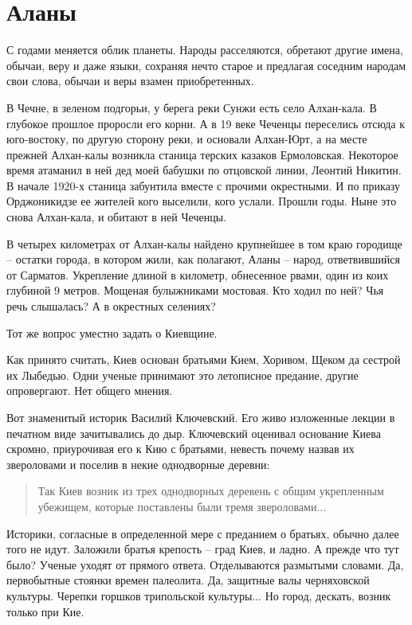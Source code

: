 \chapter{Аланы}

С годами меняется облик планеты. Народы расселяются, обретают другие имена, обычаи, веру и даже языки, сохраняя нечто старое и предлагая соседним народам свои слова, обычаи и веры взамен приобретенных.

В Чечне, в зеленом подгорьи, у берега реки Сунжи есть село Алхан-кала. В глубокое прошлое проросли его корни. А в 19 веке Чеченцы переселись отсюда к юго-востоку, по другую сторону реки, и основали Алхан-Юрт, а на месте прежней Алхан-калы возникла станица терских казаков Ермоловская. Некоторое время атаманил в ней дед моей бабушки по отцовской линии, Леонтий Никитин. В начале 1920-х станица забунтила вместе с прочими окрестными. И по приказу Орджоникидзе ее жителей кого выселили, кого услали. Прошли годы. Ныне это снова Алхан-кала, и обитают в ней Чеченцы.

В четырех километрах от Алхан-калы найдено крупнейшее в том краю городище – остатки города, в котором жили, как полагают, Аланы – народ, ответвившийся от Сарматов. Укрепление длиной в километр, обнесенное рвами, один из коих глубиной 9 метров. Мощеная булыжниками мостовая. Кто ходил по ней? Чья речь слышалась? А в окрестных селениях?

Тот же вопрос уместно задать о Киевщине.

Как принято считать, Киев основан братьями Кием, Хоривом, Щеком да сестрой их Лыбедью. Одни ученые принимают это летописное предание, другие опровергают. Нет общего мнения.

Вот знаменитый историк Василий Ключевский. Его живо изложенные лекции в печатном виде зачитывались до дыр. Ключевский оценивал основание Киева скромно, приурочивая его к Кию с братьями, невесть почему назвав их звероловами и поселив в некие однодворные деревни: 

\begin{quotation}
Так Киев возник из трех однодворных деревень с общим укрепленным убежищем, которые поставлены были тремя звероловами...
\end{quotation}

Историки, согласные в определенной мере с преданием о братьях, обычно далее того не идут. Заложили братья крепость – град Киев, и ладно. А прежде что тут было? Ученые уходят от прямого ответа. Отделываются размытыми словами. Да, первобытные стоянки времен палеолита. Да, защитные валы черняховской культуры. Черепки горшков трипольской культуры... Но город, дескать, возник только при Кие.

